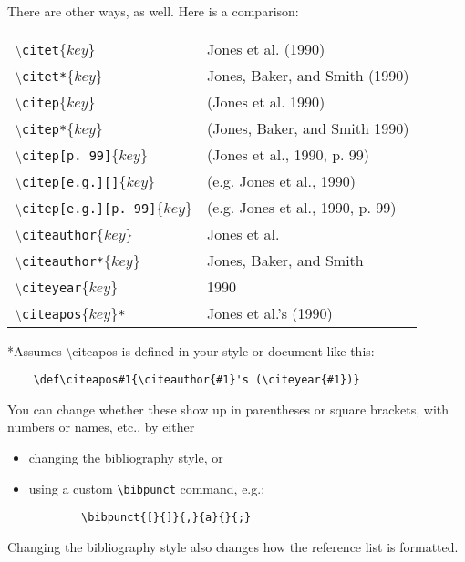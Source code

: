 \documentclass{article}
\begin{document}
\vspace{\baselineskip}
\noindent There are other ways, as well. Here is a comparison:\\[12pt]
\begin{tabular}{l l }
\textbackslash \texttt{citet}$\{\textit{key}\}$ & 	Jones et al. (1990) \\
\textbackslash \texttt{citet*}$\{\textit{key}\}$ & 	Jones, Baker, and Smith (1990) \\
\textbackslash \texttt{citep}$\{\textit{key}\}$	& (Jones et al. 1990) \\
\textbackslash \texttt{citep*}$\{\textit{key}\}$ & 	(Jones, Baker, and Smith 1990) \\
\textbackslash \texttt{citep[p.~99]}$\{\textit{key}\}$ & 	(Jones et al., 1990, p. 99) \\
\textbackslash \texttt{citep[e.g.][]}$\{\textit{key}\}$ & 	(e.g. Jones et al., 1990) \\
\textbackslash \texttt{citep[e.g.][p.~99]}$\{\textit{key}\}$ & 	(e.g. Jones et al., 1990, p. 99) \\
\textbackslash \texttt{citeauthor}$\{\textit{key}\}$ &	Jones et al. \\
\textbackslash \texttt{citeauthor*}$\{\textit{key}\}$ &	Jones, Baker, and Smith \\
\textbackslash \texttt{citeyear}$\{\textit{key}\}$ &	1990 \\
\textbackslash \texttt{citeapos}$\{\textit{key}\}$\texttt{*} &	Jones et al.'s (1990)
\end{tabular}
\vspace{\baselineskip}

*Assumes \textbackslash citeapos is defined in your style or document like this:
\begin{lstlisting}
    \def\citeapos#1{\citeauthor{#1}'s (\citeyear{#1})}
\end{lstlisting}

\noindent
You can change whether these show up in parentheses or square brackets, with numbers or names, etc., by either
\begin{itemize}
    \item changing the bibliography style, or
    \item using a custom \texttt{\textbackslash bibpunct} command, e.g.:
    \begin{lstlisting}
        \bibpunct{[}{]}{,}{a}{}{;}
    \end{lstlisting}
\end{itemize}

\noindent Changing the bibliography style also changes how the reference list is formatted.



\end{document}
